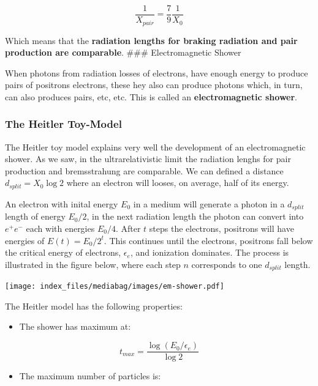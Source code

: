 \documentclass[
  letterpaper,
  DIV=11,
  numbers=noendperiod]{scrreprt}
\providecommand{\tightlist}{%
  \setlength{\itemsep}{0pt}\setlength{\parskip}{0pt}}\usepackage{longtable,booktabs,array}
\begin{document}
\[\frac{1}{X_{pair}} = \frac{7}{9}\frac{1}{X_0}\]

Which means that the \textbf{radiation lengths for braking radiation and
pair production are comparable}. \#\#\# Electromagnetic Shower

When photons from radiation losses of electrons, have enough energy to
produce pairs of positrons electrons, these hey also can produce photons
which, in turn, can also produces pairs, etc, etc. This is called an
\textbf{electromagnetic shower}.

\subsubsection*{The Heitler Toy-Model}\label{the-heitler-toy-model}

The Heitler toy model explains very well the development of an
electromagnetic shower. As we saw, in the ultrarelativistic limit the
radiation lenghs for pair production and bremsstrahung are comparable.
We can defined a distance \(d_{split} = X_0 \log2\) where an electron
will looses, on average, half of its energy.

An electron with inital energy \(E_0\) in a medium will generate a
photon in a \(d_{split}\) length of energy \(E_0/2\), in the next
radiation length the photon can convert into \(e^+e^-\) each with
energies \(E_0/4\). After \(t\) steps the electrons, positrons will have
energies of \(E(t)=E_0/2^t\). This continues until the electrons,
positrons fall below the critical energy of electrons, \(\epsilon_e\),
and ionization dominates. The process is illustrated in the figure
below, where each step \(n\) corresponds to one \(d_{split}\) length.

\begin{center}
\texttt{[image: index\_files/mediabag/images/em-shower.pdf]}
\end{center}

The Heitler model has the following properties:

\begin{itemize}
\tightlist
\item
  The shower has maximum at:
\end{itemize}

\[t_{max} = \frac{\log(E_0/\epsilon_e)}{\log2}\]

\begin{itemize}
\tightlist
\item
  The maximum number of particles is:
\end{itemize}
\end{document}
